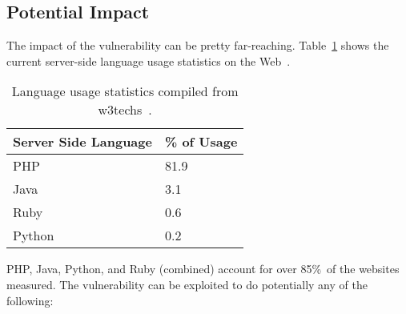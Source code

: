 \subsection{Potential Impact}

The impact of the vulnerability can be pretty far-reaching.
Table~\ref{tab:usage} shows the current server-side language usage statistics on the Web~\cite{W3techs}. 

\begin{table}[!tb]
	\centering
	\begin{tabular}{|p{4cm}|p{4cm}|}
		\hline
		\multicolumn{1}{|c|}{\textbf{Server Side Language}} & \multicolumn{1}{c|}{\textbf{\% of Usage}}\\
		\hline
		PHP & 81.9\\
		\hline
		Java & 3.1\\
		\hline
		Ruby & 0.6\\
		\hline
		Python & 0.2\\
		\hline
		
	\end{tabular}
	\caption[]{Language usage statistics compiled from w3techs~\cite{W3techs}.}
	\label{tab:usage}
\end{table}

PHP, Java, Python, and Ruby (combined) account for over 85\%\,\footnotemark{} of the websites measured. The vulnerability can be exploited to do potentially any of the following:


